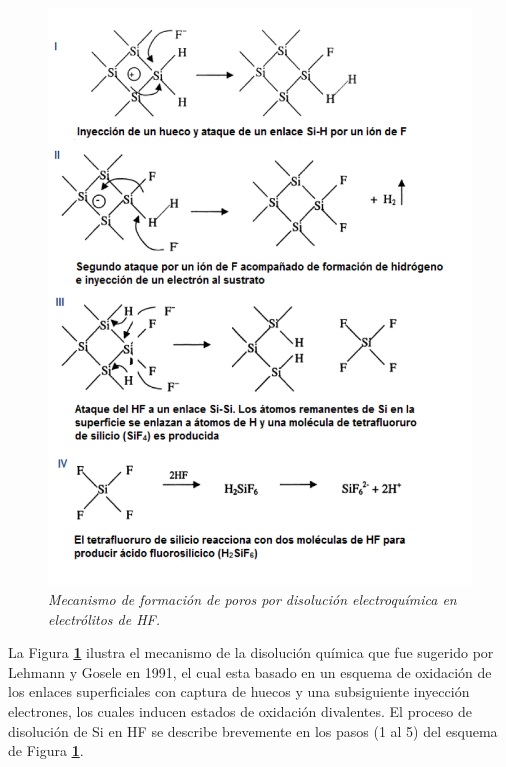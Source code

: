 \documentclass[a4paper,11pt,]{book}
\begin{document}
\begin{figure}[H]
	\centering
	\includegraphics[scale=.55]{../Images/hf}
	\caption{\emph{Mecanismo de formación de poros por disolución electroquímica en electrólitos de HF.}}
	\label{fig:CP14}
\end{figure}
 La Figura \textbf{\ref{fig:CP14}} ilustra el mecanismo de la disolución química que fue sugerido por Lehmann y Gosele en 1991, el cual esta basado en un esquema de oxidación de los enlaces superficiales con captura de huecos y una subsiguiente inyección electrones, los cuales inducen estados de oxidación divalentes. El proceso de disolución de Si en HF se describe brevemente en los pasos (1 al 5) del esquema de Figura \textbf{\ref{fig:CP14}}.
\end{document}
